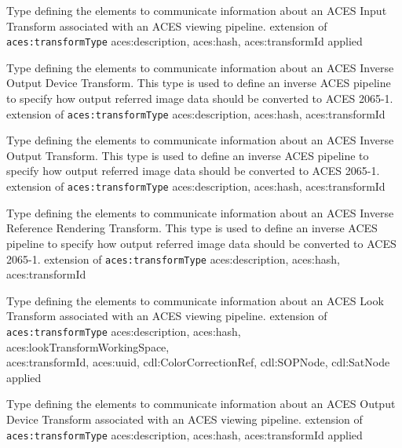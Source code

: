                 {Type defining the elements to communicate information about an ACES Input Transform associated with an ACES viewing pipeline.}
                {extension of \texttt{aces:transformType}}
                {aces:description, aces:hash, aces:transformId}
                {applied}
                
                {Type defining the elements to communicate information about an ACES Inverse Output Device Transform.  This type is used to define an inverse ACES pipeline to specify how output referred image data should be converted to ACES 2065-1.}
                {extension of \texttt{aces:transformType}}
                {aces:description, aces:hash, aces:transformId}
                
                {Type defining the elements to communicate information about an ACES Inverse Output Transform. This type is used to define an inverse ACES pipeline to specify how output referred image data should be converted to ACES 2065-1.}
                {extension of \texttt{aces:transformType}}
                {aces:description, aces:hash, aces:transformId}

                {Type defining the elements to communicate information about an ACES Inverse Reference Rendering Transform.  This type is used to define an inverse ACES pipeline to specify how output referred image data should be converted to ACES 2065-1.}
                {extension of \texttt{aces:transformType}}
                {aces:description, aces:hash, aces:transformId}

                {Type defining the elements to communicate information about an ACES Look Transform associated with an ACES viewing pipeline.}
                {extension of \texttt{aces:transformType}}
                {aces:description, aces:hash, aces:lookTransformWorkingSpace,\\ aces:transformId, aces:uuid, cdl:ColorCorrectionRef, cdl:SOPNode, cdl:SatNode}
                {applied}
                
                {Type defining the elements to communicate information about an ACES Output Device Transform associated with an ACES viewing pipeline.}
                {extension of \texttt{aces:transformType}}
                {aces:description, aces:hash, aces:transformId}
                {applied}

